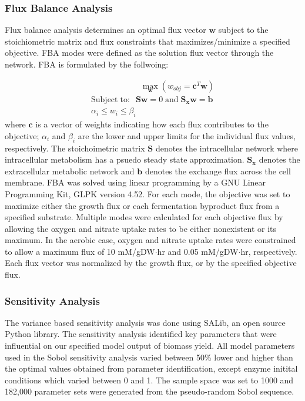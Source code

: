 \documentclass[10pt,twocolumn,twoside,final]{IEEEtran}
\begin{document}
\subsubsection*{Flux Balance Analysis}
Flux balance analysis determines an optimal flux vector $\mathbf{w}$ subject to the stoichiometric matrix and flux constraints that maximizes/minimize a specified objective.
FBA modes were defined as the solution flux vector through the network.
FBA is formulated by the follwoing:

\begin{equation}
 \begin{multlined}
	\qquad \qquad \qquad \max_{\boldsymbol{w}}{} \! \left( w_{obj} = \boldsymbol{c}^T \boldsymbol{w} \right) \\
	\mathrm{Subject \; to:}
	 \; \; \mathbf{S}\mathbf{w}=0 \mathrm{\; and \;} \mathbf{S_{x}}\mathbf{w} = \mathbf{b} \\
\alpha_i \leq w_i \leq \beta_i  \qquad
 \end{multlined}
\end{equation}
where $\boldsymbol{c}$ is a vector of weights indicating how each flux contributes to the objective; $\alpha_i$ and $\beta_i$ are the lower and upper limits for the individual flux values, respectively.
The stoichoimetric matrix $\mathbf{S}$ denotes the intracellular network where intracellular metabolism has a psuedo steady state approximation.
$\mathbf{S_{x}}$ denotes the extracellular metabolic network and $\mathbf{b}$ denotes the exchange flux across the cell membrane.
FBA was solved using linear programming by a GNU Linear Programming Kit, GLPK version 4.52.
For each mode, the objective was set to maximize either the growth flux or each fermentation byproduct flux from a specified substrate.
Multiple modes were calculated for each objective flux by allowing the oxygen and nitrate uptake rates to be either nonexistent or its maximum.
In the aerobic case, oxygen and nitrate uptake rates were constrained to allow a maximum flux of 10 mM/gDW$\cdot$hr and 0.05 mM/gDW$\cdot$hr, respectively.
Each flux vector was normalized by the growth flux, or by the specified objective flux.

\subsubsection*{Sensitivity Analysis}
The variance based sensitivity analysis\cite{2010_saltelli} was done using SALib, an open source Python library. The sensitivity analysis identified key parameters that were influential on our specified model output of biomass yield. All model parameters used in the Sobol sensitivity analysis varied between 50\% lower and higher than the optimal values obtained from parameter identification, except enzyme initital conditions which varied between 0 and 1. The sample space was set to 1000 and 182,000 parameter sets were generated from the pseudo-random Sobol sequence.
\end{document}
